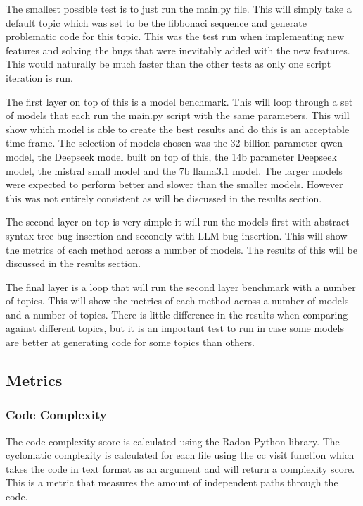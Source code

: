 \documentclass[12pt]{extarticle}
\begin{document}
The smallest possible test is to just run the main.py file. This will simply take a default topic which was set to be the fibbonaci sequence and generate problematic code for this topic. This was the test run when implementing new features and solving the bugs that were inevitably added with the new features. This would naturally be much faster than the other tests as only one script iteration is run.

The first layer on top of this is a model benchmark. This will loop through a set of models that each run the main.py script with the same parameters. This will show which model is able to create the best results and do this is an acceptable time frame. The selection of models chosen was the 32 billion parameter qwen model, the Deepseek model built on top of this, the 14b parameter Deepseek model, the mistral small model and the 7b llama3.1 model. The larger models were expected to perform better and slower than the smaller models. However this was not entirely consistent as will be discussed in the results section.

The second layer on top is very simple it will run the models first with abstract syntax tree bug insertion and secondly with LLM bug insertion. This will show the metrics of each method across a number of models. The results of this will be discussed in the results section.

The final layer is a loop that will run the second layer benchmark with a number of topics. This will show the metrics of each method across a number of models and a number of topics. There is little difference in the results when comparing against different topics, but it is an important test to run in case some models are better at generating code for some topics than others.

\subsection{Metrics}
\subsubsection{Code Complexity}

The code complexity score is calculated using the Radon Python library. The cyclomatic complexity \cite{esposito2024} is calculated for each file using the cc visit function which takes the code in text format as an argument and will return a complexity score. This is a metric that measures the amount of independent paths through the code.
\end{document}
